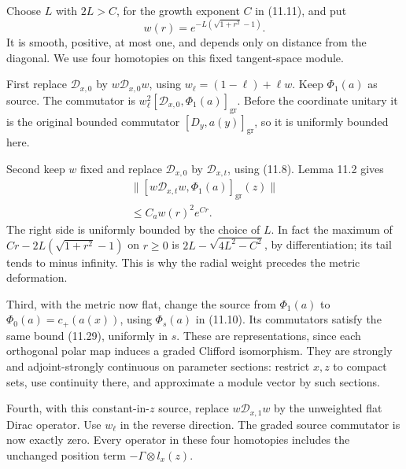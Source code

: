 \documentclass[
  11pt,
]{article}
\begin{document}
Choose \(L\) with \(2L>C\), for the growth exponent \(C\) in (11.11),
and put \[
w(r)=e^{-L(\sqrt{1+r^2}-1)}.
\tag{11.28}
\] It is smooth, positive, at most one, and depends only on distance
from the diagonal. We use four homotopies on this fixed tangent-space
module.

First replace \(\mathscr D_{x,0}\) by \(w\mathscr D_{x,0}w\), using
\(w_\ell=(1-\ell)+\ell w\). Keep \(\Phi_1(a)\) as source. The commutator
is \(w_\ell^2[\mathscr D_{x,0},\Phi_1(a)]_{\mathrm{gr}}\). Before the
coordinate unitary it is the original bounded commutator
\([D_y,a(y)]_{\mathrm{gr}}\), so it is uniformly bounded here.

Second keep \(w\) fixed and replace \(\mathscr D_{x,0}\) by
\(\mathscr D_{x,t}\), using (11.8). Lemma 11.2 gives \[
\begin{gathered}
\|[w\mathscr D_{x,t}w,\Phi_1(a)]_{\mathrm{gr}}(z)\|\\
\leq C_a w(r)^2e^{Cr}.
\end{gathered}
\tag{11.29}
\] The right side is uniformly bounded by the choice of \(L\). In fact
the maximum of \(Cr-2L(\sqrt{1+r^2}-1)\) on \(r\geq0\) is
\(2L-\sqrt{4L^2-C^2}\), by differentiation; its tail tends to minus
infinity. This is why the radial weight precedes the metric deformation.

Third, with the metric now flat, change the source from \(\Phi_1(a)\) to
\(\Phi_0(a)=c_+(a(x))\), using \(\Phi_s(a)\) in (11.10). Its commutators
satisfy the same bound (11.29), uniformly in \(s\). These are
representations, since each orthogonal polar map induces a graded
Clifford isomorphism. They are strongly and adjoint-strongly continuous
on parameter sections: restrict \(x,z\) to compact sets, use continuity
there, and approximate a module vector by such sections.

Fourth, with this constant-in-\(z\) source, replace
\(w\mathscr D_{x,1}w\) by the unweighted flat Dirac operator. Use
\(w_\ell\) in the reverse direction. The graded source commutator is now
exactly zero. Every operator in these four homotopies includes the
unchanged position term \(-\Gamma\otimes l_x(z)\).
\end{document}
